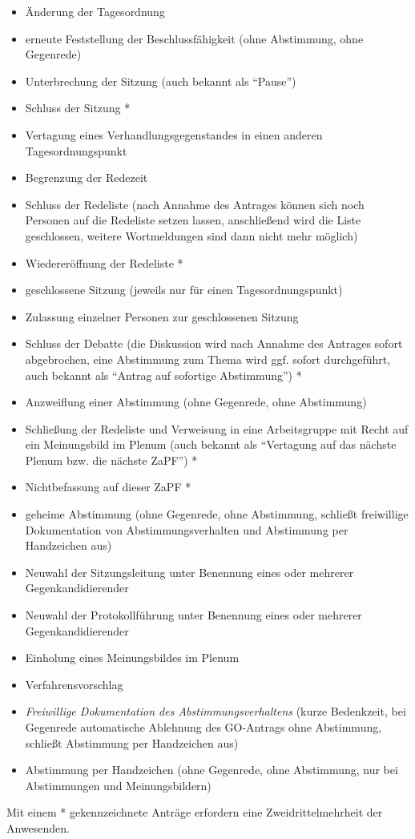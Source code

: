 \documentclass[
  ngerman,
  a4paper,
  oneside]{scrartcl}
\providecommand{\tightlist}{%
  \setlength{\itemsep}{0pt}\setlength{\parskip}{0pt}}
\begin{document}
\begin{enumerate}
  \begin{itemize}
  \tightlist
  \item
    Änderung der Tagesordnung
  \item
    erneute Feststellung der Beschlussfähigkeit (ohne Abstimmung, ohne
    Gegenrede)
  \item
    Unterbrechung der Sitzung (auch bekannt als ``Pause'')
  \item
    Schluss der Sitzung *
  \item
    Vertagung eines Verhandlungsgegenstandes in einen anderen
    Tagesordnungspunkt
  \item
    Begrenzung der Redezeit
  \item
    Schluss der Redeliste (nach Annahme des Antrages können sich noch
    Personen auf die Redeliste setzen lassen, anschließend wird die
    Liste geschlossen, weitere Wortmeldungen sind dann nicht mehr
    möglich)
  \item
    Wiedereröffnung der Redeliste *
  \item
    geschlossene Sitzung (jeweils nur für einen Tagesordnungspunkt)
  \item
    Zulassung einzelner Personen zur geschlossenen Sitzung
  \item
    Schluss der Debatte (die Diskussion wird nach Annahme des Antrages
    sofort abgebrochen, eine Abstimmung zum Thema wird ggf. sofort
    durchgeführt, auch bekannt als ``Antrag auf sofortige Abstimmung'')
    *
  \item
    Anzweiflung einer Abstimmung (ohne Gegenrede, ohne Abstimmung)
  \item
    Schließung der Redeliste und Verweisung in eine Arbeitsgruppe mit
    Recht auf ein Meinungsbild im Plenum (auch bekannt als ``Vertagung
    auf das nächste Plenum bzw. die nächste ZaPF'') *
  \item
    Nichtbefassung auf dieser ZaPF *
  \item
    geheime Abstimmung (ohne Gegenrede, ohne Abstimmung, schließt
    freiwillige Dokumentation von Abstimmungsverhalten und Abstimmung
    per Handzeichen aus)
  \item
    Neuwahl der Sitzungsleitung unter Benennung eines oder mehrerer
    Gegenkandidierender
  \item
    Neuwahl der Protokollführung unter Benennung eines oder mehrerer
    Gegenkandidierender
  \item
    Einholung eines Meinungsbildes im Plenum
  \item
    Verfahrensvorschlag
  \item
    \emph{Freiwillige Dokumentation des Abstimmungsverhaltens} (kurze
    Bedenkzeit, bei Gegenrede automatische Ablehnung des GO-Antrags ohne
    Abstimmung, schließt Abstimmung per Handzeichen aus)
  \item
    Abstimmung per Handzeichen (ohne Gegenrede, ohne Abstimmung, nur bei
    Abstimmungen und Meinungsbildern)
  \end{itemize}

  Mit einem * gekennzeichnete Anträge erfordern eine Zweidrittelmehrheit
  der Anwesenden.
\end{enumerate}
\end{document}
